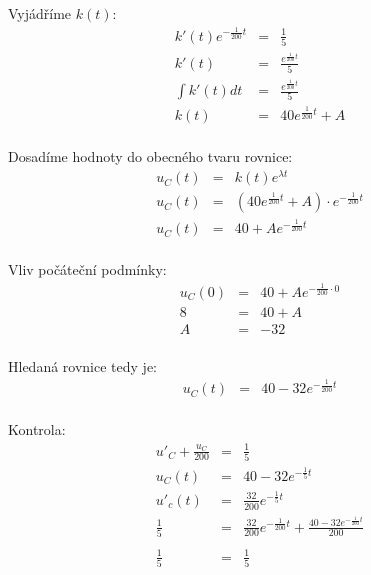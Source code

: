 \documentclass[a4paper,oneside,13pt]{article}
\begin{document}
	Vyjádříme $k(t)$:
	\begin{eqnarray*}
		k'(t)e^{-\frac{1}{200}t} & = & \frac{1}{5} \\
		k'(t) & = & \frac{e^{\frac{1}{200}t}}{5} \\ 
		\int k'(t)dt & = & \frac{e^{\frac{1}{200}t}}{5} \\
		k(t) & = & 40e^{\frac{1}{200}t} + A \\
	\end{eqnarray*}

	Dosadíme hodnoty do obecného tvaru rovnice:
	\begin{eqnarray*}
		u_{C}(t) & = & k(t)e^{\lambda t} \\
		u_{C}(t) & = & (40e^{\frac{1}{200}t} + A) \cdot e^{-\frac{1}{200}t} \\
		u_{C}(t) & = & 40 + Ae^{-\frac{1}{200}t} \\
	\end{eqnarray*}

	Vliv počáteční podmínky:
	\begin{eqnarray*}
		u_{C}(0) & = & 40 + Ae^{-\frac{1}{200} \cdot 0 } \\
		8 & = & 40 + A \\
		A & = & -32 \\
	\end{eqnarray*}

	Hledaná rovnice tedy je: 
	\begin{eqnarray*}
		u_{C}(t) & = & 40 - 32e^{-\frac{1}{200}t} \\
	\end{eqnarray*}

	Kontrola:
	\begin{eqnarray*}
		u'_{C} + \frac{u_{C}}{200} & = & \frac{1}{5} \\
		u_{C}(t) & = & 40 - 32e^{-\frac{1}{5}t} \\
		u'_{c}(t) & = & \frac{32}{200}e^{-\frac{1}{5}t} \\
		\frac{1}{5} & = & \frac{32}{200}e^{-\frac{1}{200}t} + \frac{40 - 32e^{-\frac{1}{200}t}}{200} \\ \\
		\frac{1}{5} & = & \frac{1}{5} \\
	\end{eqnarray*}

	\newpage
\end{document}
